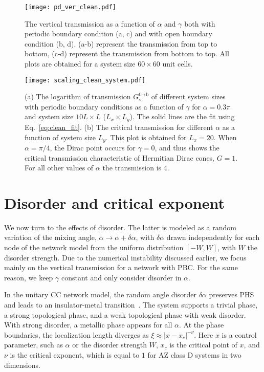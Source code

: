\documentclass[aps,pra,reprint,superscriptaddress,showkeys,amsmath,amssymb,longbibliography]{revtex4-1}
\begin{document}
\begin{figure}
\centering
\texttt{[image: pd\_ver\_clean.pdf]}
\caption{The vertical transmission as a function of $\alpha$ and $\gamma$ both with periodic boundary condition (a, c) and with open boundary condition (b, d). 
(a-b) represent the transmission from top to bottom, (c-d) represent the transmission from bottom to top. 
All plots are obtained for a system size $60\times 60$ unit cells.
\label{fig:vertical_transmission}}
\end{figure}

\begin{figure}
\centering
\texttt{[image: scaling\_clean\_system.pdf]}
\caption{(a) The logarithm of transmission $G_{\text{v}}^{\text{t}\rightarrow\text{b}}$ of different system sizes with periodic boundary conditions as a function of $\gamma$ for $\alpha=0.3\pi$ and system size $10L\times L$ ($L_x\times L_y$). 
The solid lines are the fit using Eq.~\eqref{eq:clean_fit}.
(b) The critical transmission for different $\alpha$ as a function of system size $L_y$. 
This plot is obtained for $L_x=20$. When $\alpha=\pi/4$, the Dirac point occurs for $\gamma=0$, and thus shows the critical transmission characteristic of Hermitian Dirac cones, $G=1$. 
For all other values of $\alpha$ the transmission is 4. 
\label{fig: scaling_fit_clean}}
\end{figure}

\section{Disorder and critical exponent}
\label{sec:disorder}

We now turn to the effects of disorder.
The latter is modeled as a random variation of the mixing angle, $\alpha \to \alpha + \delta\alpha$, with $\delta\alpha$ drawn independently for each node of the network model from the uniform distribution $[-W, W]$, with $W$ the disorder strength.
Due to the numerical instability discussed earlier, we focus mainly on the vertical transmission for a network with PBC.
For the same reason, we keep $\gamma$ constant and only consider disorder in $\alpha$.

In the unitary CC network model, the random angle disorder $\delta\alpha$ preserves PHS and leads to an insulator-metal transition~\cite{Chalker_tqhe, Evers_rmp}.
The system supports a trivial phase, a strong topological phase, and a weak topological phase with weak disorder.
With strong disorder, a metallic phase appears for all $\alpha$.
At the phase boundaries, the localization length diverges as $\xi\approx |x-x_c|^{-\nu}$.
Here $x$ is a control parameter, such as $\alpha$ or the disorder strength $W$, $x_c$ is the critical point of $x$, and $\nu$ is the critical exponent, which is equal to $1$ for AZ class D systems in two dimensions. 
\end{document}
